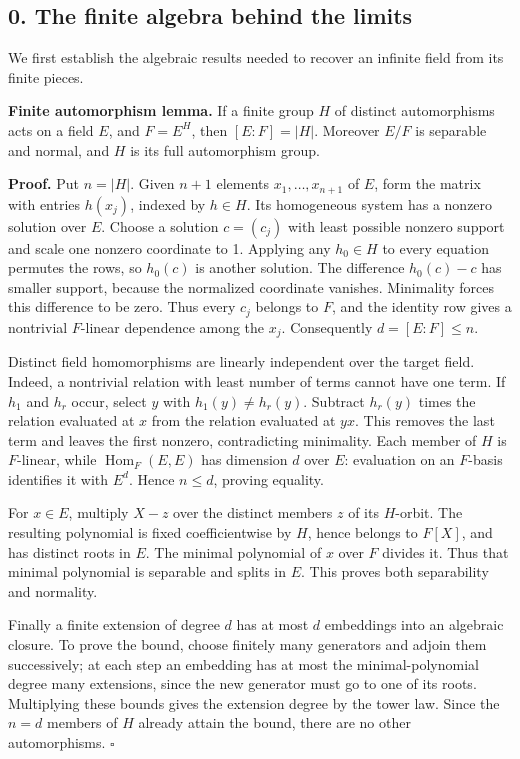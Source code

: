 \documentclass[11pt,a4paper]{article}
\begin{document}
\subsection{0. The finite algebra behind the
limits}\label{the-finite-algebra-behind-the-limits}

We first establish the algebraic results needed to recover an infinite
field from its finite pieces.

\textbf{Finite automorphism lemma.} If a finite group \(H\) of distinct
automorphisms acts on a field \(E\), and \(F=E^H\), then \([E:F]=|H|\).
Moreover \(E/F\) is separable and normal, and \(H\) is its full
automorphism group.

\textbf{Proof.} Put \(n=|H|\). Given \(n+1\) elements
\(x_1,\ldots,x_{n+1}\) of \(E\), form the matrix with entries
\(h(x_j)\), indexed by \(h\in H\). Its homogeneous system has a nonzero
solution over \(E\). Choose a solution \(c=(c_j)\) with least possible
nonzero support and scale one nonzero coordinate to 1. Applying any
\(h_0\in H\) to every equation permutes the rows, so \(h_0(c)\) is
another solution. The difference \(h_0(c)-c\) has smaller support,
because the normalized coordinate vanishes. Minimality forces this
difference to be zero. Thus every \(c_j\) belongs to \(F\), and the
identity row gives a nontrivial \(F\)-linear dependence among the
\(x_j\). Consequently \(d=[E:F]\leq n\).

Distinct field homomorphisms are linearly independent over the target
field. Indeed, a nontrivial relation with least number of terms cannot
have one term. If \(h_1\) and \(h_r\) occur, select \(y\) with
\(h_1(y)\ne h_r(y)\). Subtract \(h_r(y)\) times the relation evaluated
at \(x\) from the relation evaluated at \(yx\). This removes the last
term and leaves the first nonzero, contradicting minimality. Each member
of \(H\) is \(F\)-linear, while \(\operatorname{Hom}_F(E,E)\) has
dimension \(d\) over \(E\): evaluation on an \(F\)-basis identifies it
with \(E^d\). Hence \(n\leq d\), proving equality.

For \(x\in E\), multiply \(X-z\) over the distinct members \(z\) of its
\(H\)-orbit. The resulting polynomial is fixed coefficientwise by \(H\),
hence belongs to \(F[X]\), and has distinct roots in \(E\). The minimal
polynomial of \(x\) over \(F\) divides it. Thus that minimal polynomial
is separable and splits in \(E\). This proves both separability and
normality.

Finally a finite extension of degree \(d\) has at most \(d\) embeddings
into an algebraic closure. To prove the bound, choose finitely many
generators and adjoin them successively; at each step an embedding has
at most the minimal-polynomial degree many extensions, since the new
generator must go to one of its roots. Multiplying these bounds gives
the extension degree by the tower law. Since the \(n=d\) members of
\(H\) already attain the bound, there are no other automorphisms.
\(\square\)
\end{document}
